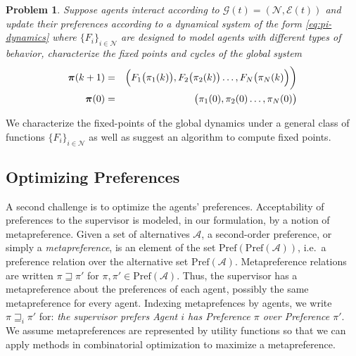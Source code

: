 \documentclass[conference]{ieeeconf}
\newcommand{\N}{\mathcal{N}}
\newcommand{\A}{\mathcal{A}}
\newcommand{\Pref}{\mathrm{Pref}}
\newcommand{\metaprefers}{\sqsupseteq}
\newcommand{\graph}{\mathcal{G}}
\newcommand{\edges}{\mathcal{E}}
\newtheorem{problem}{Problem}
\begin{document}
\begin{problem} \label{prob:dynamics}
    Suppose agents interact according to $\graph(t) = (\N,\edges(t))$ and update their preferences according to a dynamical system of the form \eqref{eq:pi-dynamics} where $\{F_i\}_{i \in \N}$ are designed to model agents with different types of behavior, characterize the fixed points and cycles of the global system
    \begin{align*}
        \boldsymbol{\pi}(k+1) &=& \Bigl( F_1\bigl(\pi_1(k) \bigr), F_2\bigl(\pi_2(k) \bigr) \dots, F_N\bigl(\pi_N(k) \Bigr)\biggr) \\
        \boldsymbol{\pi}(0) &=& \bigl( \pi_{1}(0), \pi_{2}(0) \dots, \pi_{N}(0) \bigr)
    \end{align*}
\end{problem}

We characterize the fixed-points of the global dynamics under a general class of functions $\{ F_i \}_{i \in \N}$ as well as suggest an algorithm to compute fixed points.

\subsection{Optimizing Preferences}

A second challenge is to optimize the agents' preferences.
Acceptability of preferences to the supervisor is modeled, in our formulation, by a notion of metapreference. Given a set of alternatives $\A$, a second-order preference, or simply a \emph{metapreference}, is an element of the set $\Pref(\Pref(\A))$, i.e.~a preference relation over the alternative set $\Pref(\A)$. Metapreference relations are written $\pi \metaprefers \pi'$ for $\pi, \pi' \in \Pref(\A)$. Thus, the supervisor has a metapreference about the preferences of each agent, possibly the same metapreference for every agent. Indexing metaprefences by agents, we write $\pi \metaprefers_i \pi'$ for: \emph{the supervisor prefers Agent $i$ has Preference $\pi$ over Preference $\pi'$}. We assume metapreferences are represented by utility functions so that we can apply methods in combinatorial optimization to maximize a metapreference.
\end{document}
